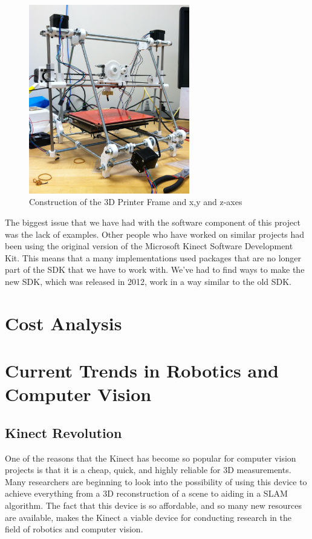 \documentclass[pdftex,10.5pt]{report}
\begin{document}
\begin{figure}[H]
	\centering
	\includegraphics[width=70mm]{figures/photo.JPG}
	\caption{Construction of the 3D Printer Frame and x,y and z-axes}
	\label{basebuilt}
\end{figure}

The biggest issue that we have had with the software component of this project was the lack of examples. Other people who have worked on similar projects had been using the original version of the Microsoft Kinect Software Development Kit. This means that a many implementations used packages that are no longer part of the SDK that we have to work with. We've had to find ways to make the new SDK, which was released in 2012, work in a way similar to the old SDK. 

\section{Cost Analysis}


\section{Current Trends in Robotics and Computer Vision}

\subsection{Kinect Revolution}
One of the reasons that the Kinect has become so popular for computer vision projects is that it is a cheap, quick, and highly reliable for 3D measurements. Many researchers are beginning to look into the possibility of using this device to achieve everything from a 3D reconstruction of a scene to aiding in a SLAM algorithm. The fact that this device is so affordable, and so many new resources are available, makes the Kinect a viable device for conducting research in the field of robotics and computer vision.
\end{document}
